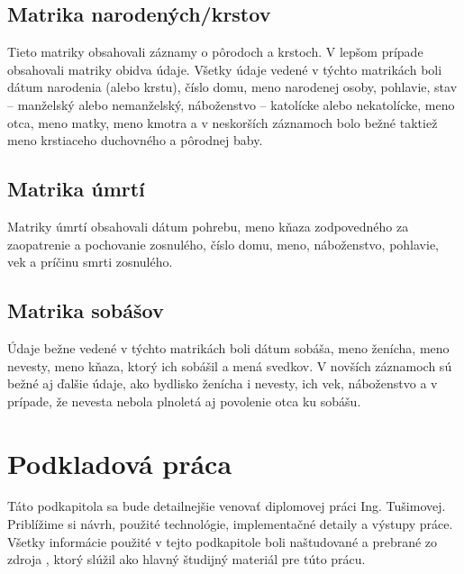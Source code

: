 \subsection*{Matrika narodených/krstov}
Tieto matriky obsahovali záznamy o pôrodoch a krstoch. V lepšom prípade obsahovali 
matriky obidva údaje. Všetky údaje vedené v týchto matrikách boli dátum narodenia (alebo 
krstu), číslo domu, meno narodenej osoby, pohlavie, stav – manželský alebo nemanželský, 
náboženstvo – katolícke alebo nekatolícke, meno otca, meno matky, meno kmotra 
a v neskorších záznamoch bolo bežné taktiež meno krstiaceho duchovného a pôrodnej 
baby. 

\subsection*{Matrika úmrtí} 
Matriky úmrtí obsahovali dátum pohrebu, meno kňaza zodpovedného za zaopatrenie 
a pochovanie zosnulého, číslo domu, meno, náboženstvo, pohlavie, vek a príčinu smrti 
zosnulého. 

\subsection*{Matrika sobášov}
Údaje bežne vedené v týchto matrikách boli dátum sobáša, meno ženícha, meno nevesty, 
meno kňaza, ktorý ich sobášil a mená svedkov. V novších záznamoch sú bežné aj ďalšie údaje, 
ako bydlisko ženícha i nevesty, ich vek, náboženstvo a v prípade, že nevesta nebola plnoletá 
aj povolenie otca ku sobášu.

\section{Podkladová práca}
Táto podkapitola sa bude detailnejšie venovať diplomovej práci Ing. Tušimovej. Priblížime si 
návrh, použité technológie, implementačné detaily a výstupy práce. Všetky informácie 
použité v tejto podkapitole boli naštudované a prebrané zo zdroja \cite{formalniDP}, ktorý slúžil ako hlavný 
študijný materiál pre túto prácu.


